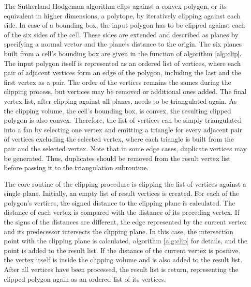 The Sutherland-Hodgeman algorithm clips against a convex polygon, or its equivalent in higher dimensions, \ie a polytope, by iteratively clipping against each side.
In case of a bounding box, the input polygon has to be clipped against each of the six sides of the cell.
These sides are extended and described as planes by specifying a normal vector and the plane's distance to the origin.
The six planes built from a cell's bounding box are given in the  function of algorithm \ref{alg:clip}.
The input polygon itself is represented as an ordered list of vertices, where each pair of adjacent vertices form an edge of the polygon, including the last and the first vertex as a pair.
The order of the vertices remains the sames during the clipping process, but vertices may be removed or additional ones added.
The final vertex list, after clipping against all planes, needs to be triangulated again.
As the clipping volume, \ie the cell's bounding box, is convex, the resulting clipped polygon is also convex.
Therefore, the list of vertices can be simply triangulated into a fan by selecting one vertex and emitting a triangle for every adjacent pair of vertices excluding the selected vertex, where each triangle is built from the pair and the selected vertex.
Note that in some edge cases, duplicate vertices may be generated.
Thus, duplicates should be removed from the result vertex list before passing it to the triangulation subroutine.

The core routine of the clipping procedure is clipping the list of vertices against a single plane.
Initially, an empty list of result vertices is created.
For each of the polygon's vertices, the signed distance to the clipping plane is calculated.
The distance of each vertex is compared with the distance of its preceding vertex.
If the signs of the distances are different, the edge represented by the current vertex and its predecessor intersects the clipping plane.
In this case, the intersection point with the clipping plane is calculated, \cf algorithm \ref{alg:clip} for details, and the point is added to the result list.
If the distance of the current vertex is positive, the vertex itself is inside the clipping volume and is also added to the result list.
After all vertices have been processed, the result list is return, representing the clipped polygon again as an ordered list of its vertices.

